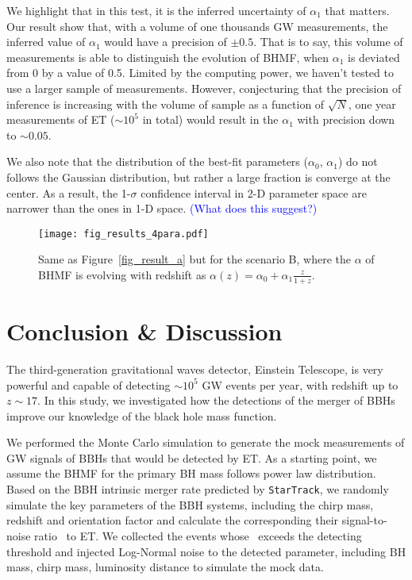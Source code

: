 \documentclass[twocolumn]{aastex62}
\begin{document}
We highlight that in this test, it is the inferred uncertainty of $\alpha_1$ that matters. Our result show that, with a volume of one thousands GW measurements, the inferred value of $\alpha_1$ would have a precision of $\pm0.5$. That is to say, this volume of measurements is able to distinguish the evolution of BHMF, when $\alpha_1$ is deviated from 0 by a value of 0.5. Limited by the computing power, we haven't tested to use a larger sample of measurements. However, conjecturing that the precision of inference is increasing with the volume of sample as a function of $\sqrt{N}$, one year measurements of ET ($\sim10^5$ in total) would result in the $\alpha_1$ with precision down to $\sim0.05$.

We also note that the distribution of the best-fit parameters ($\alpha_0$, $\alpha_1$) do not follows the Gaussian distribution, but rather a large fraction is converge at the center. As a result, the 1-$\sigma$ confidence interval in 2-D parameter space are narrower than the ones in 1-D space. \textcolor{blue}{(What does this suggest?)} 

\begin{figure}%
\texttt{[image: fig\_results\_4para.pdf]}
\caption{
Same as Figure~\ref{fig_result_a} but for the scenario B, where the $\alpha$ of BHMF is evolving with redshift as $\alpha(z) = \alpha_0 + \alpha_1\frac{z}{1+z}$. 
}
\label{fig_result_b}
\end{figure}

\vspace{1cm}
\section{Conclusion \& Discussion} \label{sec_summary}
The third-generation gravitational waves detector, Einstein Telescope, is very powerful and capable of detecting $\sim10^5$ GW events per year, with redshift up to $z\sim17$. In this study, we investigated how the detections of the merger of BBHs improve our knowledge of the black hole mass function.

We performed the Monte Carlo simulation to generate the mock measurements of GW signals of BBHs that would be detected by ET. As a starting point, we assume the BHMF for the primary BH mass follows power law distribution. Based on the BBH intrinsic merger rate predicted by {\tt StarTrack}, we randomly simulate the key parameters of the BBH systems, including the chirp mass, redshift and orientation factor and calculate the corresponding their signal-to-noise ratio \snr\ to ET. We collected the events whose \snr\ exceeds the detecting threshold and injected Log-Normal noise to the detected parameter, including BH mass, chirp mass, luminosity distance to simulate the mock data.
\end{document}
